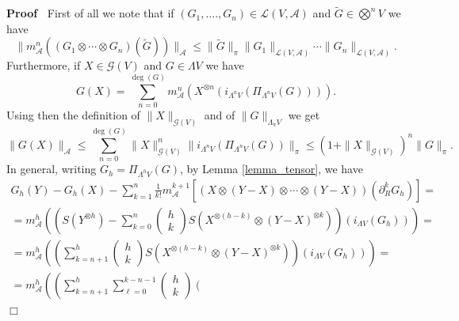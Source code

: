 \documentclass{article}
\newenvironment{proof}{\noindent\textbf{Proof\ }}{\hspace*{\fill}$\Box$\medskip}
\begin{document}
\begin{proof}
  First of all we note that if $(G_1, \ldots ., G_n) \in \mathcal{L} (V,
  \mathcal{A})$ and $\tilde{G} \in \bigotimes^n V$ we have
  \begin{equation}
    \| m_{\mathcal{A}}^n ((G_1 \otimes \cdots \otimes G_n) (\tilde{G}))
    \|_{\mathcal{A}} \leqslant \| \tilde{G} \|_{\pi} \| G_1 \|_{\mathcal{L}
    (V, \mathcal{A})} \cdots \| G_n \|_{\mathcal{L} (V, \mathcal{A})} ._{}
    \label{eq:inequalitytensor}
  \end{equation}
  Furthermore, if $X \in \mathcal{G} (V)$ and $G \in \Lambda V$ we have
  \[ G (X) = \sum^{\deg (G)}_{n = 0} m_{\mathcal{A}}^n (X^{\otimes n}
     (i_{\Lambda^n V} (\Pi_{\Lambda^n V} (G)))) . \]
  Using then the definition of $\| X \|_{\mathcal{G} (V)}$ and of $\| G
  \|_{\Lambda_{\pi} V}$ we get
  \[ \| G (X) \|_{\mathcal{A}} \leqslant \sum_{n = 0}^{\deg (G)} \| X
     \|_{\mathcal{G} (V)}^n \| i_{\Lambda^n V} (\Pi_{\Lambda^n V} (G))
     \|_{\pi} \leqslant (1 + \| X \|_{\mathcal{G} (V)})^n \| G \|_{\pi} . \]
  In general, writing $G_h = \Pi_{\Lambda^h V} (G)$, by Lemma
  \ref{lemma_tensor}, we have
  \begin{equation}
    \begin{array}{c}
      G_h (Y) - G_h (X) - \sum_{k = 1}^n \frac{1}{k!} m_{\mathcal{A}}^{k + 1}
      [(X \otimes (Y - X) \otimes \cdots \otimes (Y - X)) (\partial_R^k G_h)]
      =\\
      = m_{\mathcal{A}}^h \left( \left( S (Y^{\otimes h}) - \sum_{k = 0}^n
      \left( \begin{array}{c}
        h\\
        k
      \end{array} \right) S (X^{\otimes (h - k)} \otimes (Y - X)^{\otimes k})
      \right) (i_{\Lambda V} (G_h)) \right) =\\
      = m_{\mathcal{A}}^h \left( \left( \sum_{k = n + 1}^h \left(
      \begin{array}{c}
        h\\
        k
      \end{array} \right) S (X^{\otimes (h - k)} \otimes (Y - X)^{\otimes k})
      \right) (i_{\Lambda V} (G_h)) \right) =\\
      = m_{\mathcal{A}}^h \left. \left. \left. \left( \left( \sum_{k = n +
      1}^h \sum_{\ell = 0}^{k - n - 1} \left( \begin{array}{c}
        h\\
        k
      \end{array} \right) \left( \begin{array}{c}

\end{array}
\end{array}
\end{equation}
\end{proof}
\end{document}
